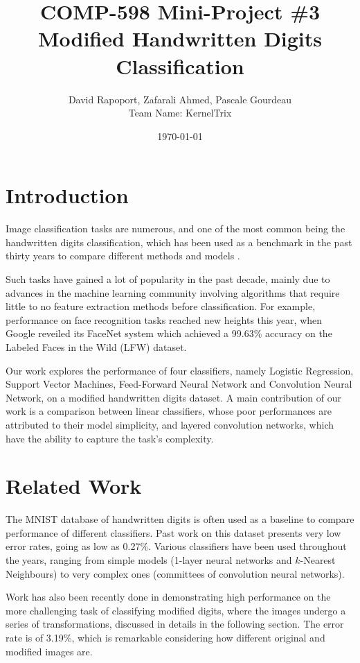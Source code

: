 \documentclass[conference]{IEEEtran}
\author{David Rapoport, Zafarali Ahmed, Pascale Gourdeau\\Team Name: KernelTrix}
\title{COMP-598 Mini-Project \#3\\Modified Handwritten Digits Classification}
\date{\today}
\begin{document}
\maketitle

\section{Introduction}

Image classification tasks are numerous, and one of the most common being the handwritten digits classification, which has been used as a benchmark in the past thirty years to compare different methods and models\cite{LeCun90} \cite{MNIST_Original}. 

Such tasks have gained a lot of popularity in the past decade, mainly due to advances in the machine learning community involving algorithms that require little to no feature extraction methods before classification. For example, performance on face recognition tasks reached new heights this year, when Google reveiled its FaceNet system which achieved a 99.63\% accuracy 	on the Labeled Faces in the Wild (LFW) dataset\cite{FaceNet}.


Our work explores the performance of four classifiers, namely Logistic Regression, Support Vector Machines, Feed-Forward Neural Network and Convolution Neural Network, on a modified handwritten digits dataset. A main contribution of our work is a comparison between linear classifiers, whose poor performances are attributed to their model simplicity, and layered convolution networks, which have the ability to capture the task's complexity.



\section{Related Work}

The MNIST database of handwritten digits\cite{MNIST_Original} is often used as a baseline to compare performance of different classifiers. Past work on this dataset \cite{MNIST_Original} \cite{LeCun90} \cite{CNN_committees} presents very low error rates, going as low as 0.27\%. Various classifiers have been used throughout the years, ranging from simple models (1-layer neural networks and $k$-Nearest Neighbours) to very complex ones (committees of convolution neural networks).

Work has also been recently done in \cite{modifiedMNIST} demonstrating high performance on the more challenging task of classifying modified digits, where the images undergo a series of transformations, discussed in details in the following section. The error rate is of 3.19\%, which is remarkable considering how different original and modified images are.
\end{document}
